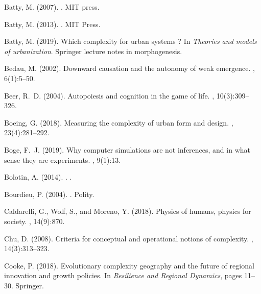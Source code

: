 \documentclass[graybox]{svmult}
\begin{document}
\begin{thebibliography}{}
Batty, M. (2007).
.
\newblock MIT press.

Batty, M. (2013).
.
\newblock MIT Press.

Batty, M. (2019).
\newblock Which complexity for urban systems ?
\newblock In {\em Theories and models of urbanization}. Springer lecture notes
  in morphogenesis.

Bedau, M. (2002).
\newblock Downward causation and the autonomy of weak emergence.
,
  6(1):5--50.

Beer, R.~D. (2004).
\newblock Autopoiesis and cognition in the game of life.
, 10(3):309--326.

Boeing, G. (2018).
\newblock Measuring the complexity of urban form and design.
, 23(4):281--292.

Boge, F.~J. (2019).
\newblock Why computer simulations are not inferences, and in what sense they
  are experiments.
, 9(1):13.

{Bolotin}, A. (2014).
.
.

Bourdieu, P. (2004).
.
\newblock Polity.

Caldarelli, G., Wolf, S., and Moreno, Y. (2018).
\newblock Physics of humans, physics for society.
, 14(9):870.

Chu, D. (2008).
\newblock Criteria for conceptual and operational notions of complexity.
, 14(3):313--323.

Cooke, P. (2018).
\newblock Evolutionary complexity geography and the future of regional
  innovation and growth policies.
\newblock In {\em Resilience and Regional Dynamics}, pages 11--30. Springer.


\end{thebibliography}
\end{document}
